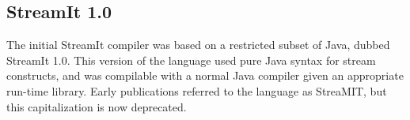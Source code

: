 \documentclass[11pt]{article}
\begin{document}
\subsection{StreamIt 1.0}

The initial StreamIt compiler was based on a restricted subset of
Java, dubbed StreamIt 1.0.  This version of the language used pure
Java syntax for stream constructs, and was compilable with a normal
Java compiler given an appropriate run-time library.  Early
publications referred to the language as StreaMIT, but this
capitalization is now deprecated.
\end{document}
